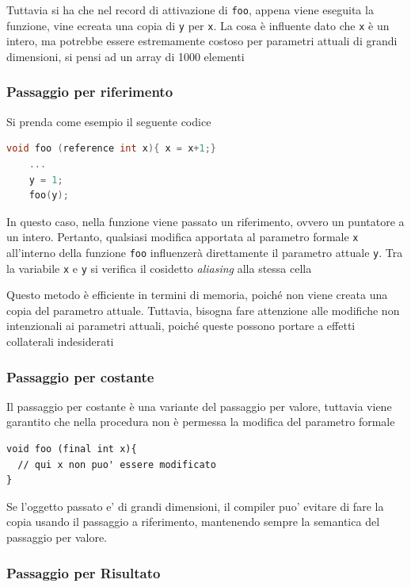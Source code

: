 Tuttavia si ha che nel record  di attivazione di \texttt{foo}, appena viene eseguita la funzione, vine ecreata una copia di \texttt{y} per \texttt{x}. La cosa è influente dato che \texttt{x} è un intero, ma potrebbe essere estremamente costoso per parametri attuali di grandi dimensioni, si pensi ad un array di 1000 elementi

\subsubsection{Passaggio per riferimento}
Si prenda come esempio il seguente codice

\begin{lstlisting}[language=C]
    void foo (reference int x){ x = x+1;}
    ...
    y = 1;
    foo(y);
\end{lstlisting}

In questo caso, nella funzione viene passato un riferimento, ovvero un puntatore a un intero. Pertanto, qualsiasi modifica apportata al parametro formale \texttt{x} all'interno della funzione \texttt{foo} influenzerà direttamente il parametro attuale \texttt{y}. Tra la variabile \texttt{x} e \texttt{y} si verifica il cosidetto \textit{aliasing} alla stessa cella

Questo metodo è efficiente in termini di memoria, poiché non viene creata una copia del parametro attuale. Tuttavia, bisogna fare attenzione alle modifiche non intenzionali ai parametri attuali, poiché queste possono portare a effetti collaterali indesiderati

\subsubsection{Passaggio per costante}

Il passaggio per costante è una variante del passaggio per valore, tuttavia viene garantito che nella procedura non è permessa la modifica del parametro formale

\begin{lstlisting}[style=cstyle]
void foo (final int x){
  // qui x non puo' essere modificato
}
\end{lstlisting}

Se l'oggetto passato e' di grandi dimensioni, il compiler puo' evitare di fare la copia usando il passaggio a riferimento, mantenendo sempre la semantica del passaggio per valore.

\subsubsection{Passaggio per Risultato}

